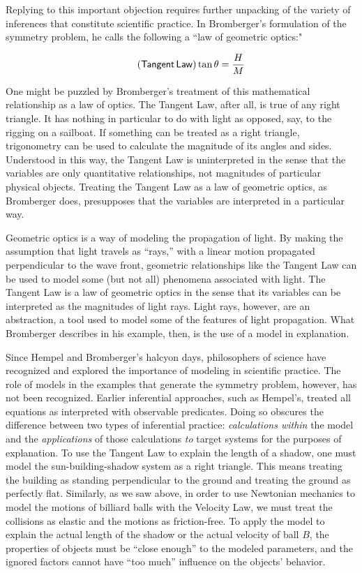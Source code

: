 \documentclass[natbib]{svjour3}                     %
\begin{document}
Replying to this important objection requires further unpacking of the variety of inferences that constitute scientific practice. In Bromberger's formulation of the symmetry problem, he calls the following a ``law of geometric optics:"

\begin{equation}
	\label{eq:tangent_law}
	\tag{$ \mathsf{Tangent\,Law} $}
	\tan \theta  = \frac{H}{M}
\end{equation}

\noindent One might be puzzled by Bromberger's treatment of this mathematical relationship as a law of optics.  The Tangent Law, after all, is true of any right triangle.  It has nothing in particular to do with light as opposed, say, to the rigging on a sailboat.  If something can be treated as a right triangle, trigonometry can be used to calculate the magnitude of its angles and sides.  Understood in this way, the Tangent Law is uninterpreted in the sense that the variables are only quantitative relationships, not magnitudes of particular physical objects.  Treating the Tangent Law as a law of geometric optics, as Bromberger does, presupposes that the variables are interpreted in a particular way.

Geometric optics is a way of modeling the propagation of light.  By making the assumption that light travels as ``rays,'' with a linear motion propagated perpendicular to the wave front, geometric relationships like the Tangent Law can be used to model some (but not all) phenomena associated with light.  The Tangent Law is a law of geometric optics in the sense that its variables can be interpreted as the magnitudes of light rays.  Light rays, however, are an abstraction, a tool used to model some of the features of light propagation.  What Bromberger describes in his example, then, is the use of a model in explanation. 

Since Hempel and Bromberger's halcyon days, philosophers of science have recognized and explored the importance of modeling in scientific practice.  The role of models in the examples that generate the symmetry problem, however, has not been recognized.  Earlier inferential approaches, such as Hempel's, treated all equations as interpreted with observable predicates. Doing so obscures the difference between two types of inferential practice: \textit{calculations within} the model and the \textit{applications} of those calculations \textit{to} target systems for the purposes of explanation. To use the Tangent Law to explain the length of a shadow, one must model the sun-building-shadow system as a right triangle.  This means treating the building as standing perpendicular to the ground and treating the ground as perfectly flat.  Similarly, as we saw above, in order to use Newtonian mechanics to model the motions of billiard balls with the Velocity Law, we must treat the collisions as elastic and the motions as friction-free. To apply the model to explain the actual length of the shadow or the actual velocity of ball $B$, the properties of objects must be ``close enough'' to the modeled parameters, and the ignored factors cannot have ``too much'' influence on the objects' behavior. 
\end{document}
